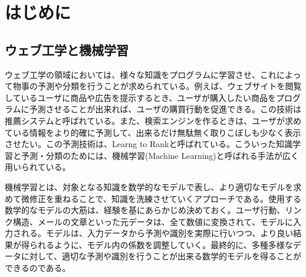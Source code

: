 \chapter{はじめに}
\label{chap:preface}
\section{ウェブ工学と機械学習}
ウェブ工学の領域においては、様々な知識をプログラムに学習させ、これによって物事の予測や分類を行うことが求められている。例えば、ウェブサイトを閲覧しているユーザに商品や広告を提示するとき、ユーザが購入したい商品をプログラムに予測させることが出来れば、ユーザの購買行動を促進できる。この技術は推薦システムと呼ばれている\cite{resnick1997recommender}。また、検索エンジンを作るときは、ユーザが求めている情報をより的確に予測して、出来るだけ無駄無く取りこぼしも少なく表示させたい。この予測技術は、Learng to Rankと呼ばれている\cite{trotman2005learning}。こういった知識学習と予測・分類のためには、機械学習(Machine Learning)と呼ばれる手法が広く用いられている。\par
機械学習とは、対象となる知識を数学的なモデルで表し、より適切なモデルを求めて微修正を重ねることで、知識を洗練させていくアプローチである。使用する数学的なモデルの大筋は、経験を基にあらかじめ決めておく。ユーザ行動、リンク構造、メールの文章といった元データは、全て数値に変換されて、モデルに入力される。モデルは、入力データから予測や識別を実際に行いつつ、より良い結果が得られるように、モデル内の係数を調整していく。最終的に、多種多様なデータに対して、適切な予測や識別を行うことが出来る数学的モデルを得ることができるのである。

